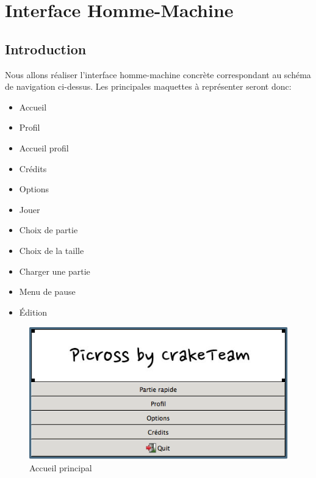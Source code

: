 \documentclass[11pt]{article}
\begin{document}

\newpage

\section{Interface Homme-Machine}
	\subsection{Introduction}
	Nous allons réaliser l'interface homme-machine concrète correspondant au schéma de navigation ci-dessus. Les principales maquettes à représenter seront donc:
	\begin{itemize}
		\item Accueil
		\item Profil
		\item Accueil profil
		\item Crédits
		\item Options
		\item Jouer
		\item Choix de partie
		\item Choix de la taille
		\item Charger une partie
		\item Menu de pause
		\item Édition
	\end{itemize}
		
		\begin{figure}[!ht]
			\centering
			\includegraphics[]{./IHM/accueil.png}
			\caption{Accueil principal}
		\end{figure}


%
\end{document}
